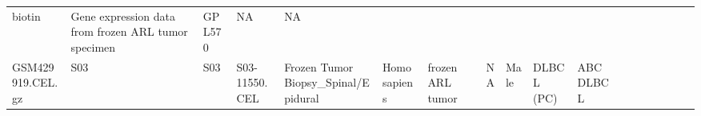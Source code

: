 \documentclass[]{article}
\begin{document}
\begin{longtable}[]{@{}lllllllrllllllllll@{}}
\begin{minipage}[t]{0.01\columnwidth}
biotin\strut
\end{minipage} & \begin{minipage}[t]{0.08\columnwidth}\raggedright
Gene expression data from frozen ARL tumor specimen\strut
\end{minipage} & \begin{minipage}[t]{0.01\columnwidth}\raggedright
GPL570\strut
\end{minipage} & \begin{minipage}[t]{0.00\columnwidth}\raggedright
NA\strut
\end{minipage} & \begin{minipage}[t]{0.01\columnwidth}\raggedright
NA\strut
\end{minipage}\tabularnewline
\begin{minipage}[t]{0.03\columnwidth}\raggedright
GSM429919.CEL.gz\strut
\end{minipage} & \begin{minipage}[t]{0.02\columnwidth}\raggedright
S03\strut
\end{minipage} & \begin{minipage}[t]{0.01\columnwidth}\raggedright
S03\strut
\end{minipage} & \begin{minipage}[t]{0.02\columnwidth}\raggedright
S03-11550.CEL\strut
\end{minipage} & \begin{minipage}[t]{0.06\columnwidth}\raggedright
Frozen Tumor Biopsy\_Spinal/Epidural\strut
\end{minipage} & \begin{minipage}[t]{0.02\columnwidth}\raggedright
Homo sapiens\strut
\end{minipage} & \begin{minipage}[t]{0.04\columnwidth}\raggedright
frozen ARL tumor\strut
\end{minipage} & \begin{minipage}[t]{0.05\columnwidth}\raggedleft
NA\strut
\end{minipage} & \begin{minipage}[t]{0.04\columnwidth}\raggedright
Male\strut
\end{minipage} & \begin{minipage}[t]{0.06\columnwidth}\raggedright
DLBCL (PC)\strut
\end{minipage} & \begin{minipage}[t]{0.06\columnwidth}\raggedright
ABC DLBCL\strut
\end{minipage} & \begin{minipage}[t]{0.04\columnwidth}\raggedright

\end{minipage}
\end{longtable}
\end{document}
